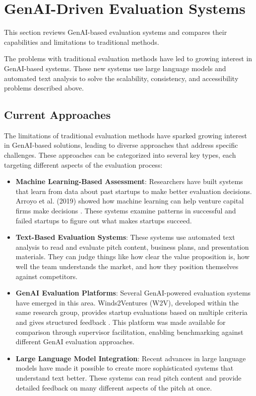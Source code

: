 \clearpage
\section{GenAI-Driven Evaluation Systems}
\label{sec:GenAI-systems}

This section reviews GenAI-based evaluation systems and compares their capabilities and limitations to traditional methods.

The problems with traditional evaluation methods have led to growing interest in GenAI-based systems. These new systems use large language models and automated text analysis to solve the scalability, consistency, and accessibility problems described above.

\subsection{Current Approaches}\label{subsec:current-approaches}
The limitations of traditional evaluation methods have sparked growing interest in GenAI-based solutions, leading to diverse approaches that address specific challenges. These approaches can be categorized into several key types, each targeting different aspects of the evaluation process:

\begin{itemize}
    \item \textbf{Machine Learning-Based Assessment}: Researchers have built systems that learn from data about past startups to make better evaluation decisions. Arroyo et al. \cite{Arroyo2019} (2019)  showed how machine learning can help venture capital firms make decisions . These systems examine patterns in successful and failed startups to figure out what makes startups succeed.

    \item \textbf{Text-Based Evaluation Systems}: These systems use automated text analysis to read and evaluate pitch content, business plans, and presentation materials. They can judge things like how clear the value proposition is, how well the team understands the market, and how they position themselves against competitors.

    \item \textbf{GenAI Evaluation Platforms}: Several GenAI-powered evaluation systems have emerged in this area. Winds2Ventures (W2V), developed within the same research group, provides startup evaluations based on multiple criteria and gives structured feedback \cite{w2v}. This platform was made available for comparison through supervisor facilitation, enabling benchmarking against different GenAI evaluation approaches.

    \item \textbf{Large Language Model Integration}: Recent advances in large language models have made it possible to create more sophisticated systems that understand text better. These systems can read pitch content and provide detailed feedback on many different aspects of the pitch at once.
\end{itemize}


